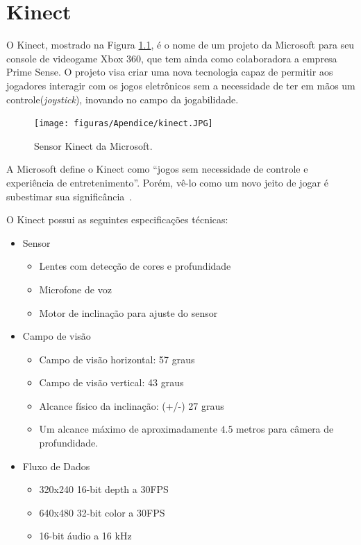 \chapter{Kinect}
\label{sec:kinect}

O Kinect, mostrado na Figura \ref{kinect}, é o nome de um projeto da Microsoft para seu console de videogame Xbox 360, que tem ainda como colaboradora a empresa Prime Sense. O projeto visa criar uma nova tecnologia capaz de permitir aos jogadores interagir com os jogos eletrônicos sem a necessidade de ter em mãos um controle(\textit{joystick}), inovando no campo da jogabilidade.

	\begin{figure}[hbt]
		\begin{center}
		\texttt{[image: figuras/Apendice/kinect.JPG]}
		\end{center}
		\caption{Sensor Kinect da Microsoft.}
		\label{kinect}
	\end{figure}

A Microsoft define o Kinect como ``jogos sem necessidade de controle e experiência de entretenimento''. Porém, vê-lo como um novo jeito de jogar é subestimar sua significância~\cite{kinect}. 

	O Kinect possui as seguintes especificações técnicas:

	\begin{itemize}
		\item Sensor
			\begin{itemize}
				\item Lentes com detecção de cores e profundidade
				\item Microfone de voz
				\item Motor de inclinação para ajuste do sensor
			\end{itemize}
		\item Campo de visão
			\begin{itemize}
				\item Campo de visão horizontal: 57 graus
				\item Campo de visão vertical: 43 graus
				\item Alcance físico da inclinação: (+/-) 27 graus
				\item Um alcance máximo de aproximadamente $\displaystyle 4.5$ metros para câmera de profundidade. 
			\end{itemize}
		\item Fluxo de Dados
			\begin{itemize}
				\item 320x240 16-bit depth a 30FPS
				\item 640x480 32-bit color a 30FPS
				\item 16-bit áudio a 16 kHz
			\end{itemize}
	\end{itemize}

